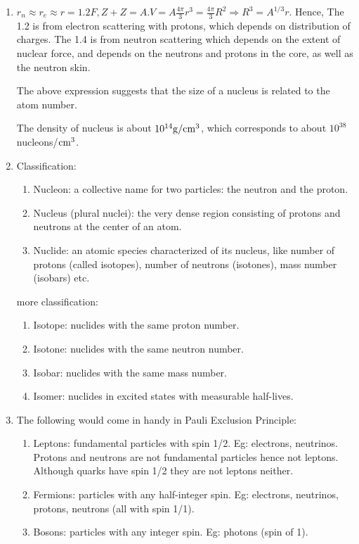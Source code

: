 \documentclass{school-22.101-notes}
\begin{document}
\begin{enumerate}
\item $r_n \approx r_e \approx r = 1.2 F, Z + Z = A. V = A \frac{4\pi}{3} r^3 = \frac{4 \pi}{3} R^2 \Rightarrow R^3 = A^{1/3} r.$ Hence,
The 1.2 is from electron scattering with protons, which depends on distribution of charges. The 1.4 is from neutron scattering which depends on the extent of nuclear force, and depends on the neutrons and protons in the core, as well as the neutron skin. 

The above expression suggests that the size of a nucleus is related to the atom number. 

The density of nucleus is about $10^{14} \mathrm{g}/\mathrm{cm}^3$, which corresponds to about $10^{38} $ nucleons/$\mathrm{cm}^3$. 


\item Classification:
  \begin{enumerate}
  \item Nucleon: a collective name for two particles: the neutron and the proton. 
  \item Nucleus (plural nuclei): the very dense region consisting of protons and neutrons at the center of an atom.
  \item Nuclide: an atomic species characterized of its nucleus, like number of protons (called isotopes), number of neutrons (isotones), mass number (isobars) etc. 
  \end{enumerate}
  more classification: 
  \begin{enumerate}
  \item Isotope: nuclides with the same proton number. 
  \item Isotone: nuclides with the same neutron number.
  \item Isobar: nuclides with the same mass number. 
  \item Isomer: nuclides in excited states with measurable half-lives. 
  \end{enumerate}



\item The following would come in  handy in Pauli Exclusion Principle: 
  \begin{enumerate}
    \item Leptons: fundamental particles with spin 1/2. Eg: electrons, neutrinos. Protons and neutrons are not fundamental particles hence not leptons. Although quarks have spin 1/2 they are not leptons neither. 
    \item Fermions: particles with any half-integer spin. Eg: electrons, neutrinos, protons, neutrons (all with spin 1/1). 
    \item Bosons: particles with any integer spin. Eg: photons (spin of 1). 
  \end{enumerate}
\end{enumerate}
\end{document}

